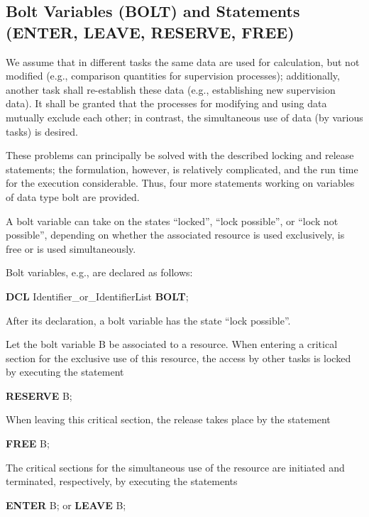 \subsection{Bolt Variables (BOLT) and Statements (ENTER, LEAVE,
RESERVE, FREE)} %

We assume that in different tasks the same data are used for
calculation, but not modified (e.g., comparison quantities for
supervision processes); additionally, another task shall re-establish
these data (e.g., establishing new supervision data). It shall be
granted that the processes for modifying and using data mutually exclude
each other; in contrast, the simultaneous use of data (by various tasks)
is desired.

These problems can principally be solved with the described locking and
release statements; the formulation, however, is relatively
complicated, and the run time for the execution considerable. Thus, four
more statements working on variables of data type bolt are provided.

A bolt variable can take on the states ``locked'', ``lock possible'', or
``lock not possible'', depending on whether the associated resource
is used exclusively, is free or is used simultaneously.

Bolt variables, e.g., are declared as follows:

{\bf DCL} Identifier\_or\_IdentifierList {\bf BOLT};

After its declaration, a bolt variable has the state ``lock possible''.

Let the bolt variable B be associated to a resource. When entering a
critical section for the exclusive use of this resource, the access by
other tasks is locked by executing the statement

{\bf RESERVE} B;

When leaving this critical section, the release takes place by the
statement

{\bf FREE} B;

The critical sections for the simultaneous use of the resource are
initiated and terminated, respectively, by executing the statements

{\bf ENTER} B; or {\bf LEAVE} B;

